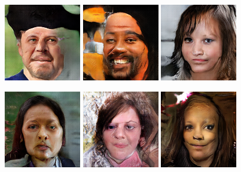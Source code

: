 \begin{figure}[!h]
    \centerline{
        \includegraphics[scale=1]{figures/ffhq/random/ffhq128x128_image0000.png}
        \includegraphics[scale=1]{figures/ffhq/random/ffhq128x128_image0001.png}
        \includegraphics[scale=1]{figures/ffhq/random/ffhq128x128_image0002.png}
    }
    \vspace{0.1cm}
    \centerline{
        \includegraphics[scale=0.485]{figures/ffhq/random/ffhq128x128_image0003.png}
        \includegraphics[scale=0.485]{figures/ffhq/random/ffhq128x128_image0004.png}
        \includegraphics[scale=0.485]{figures/ffhq/random/ffhq128x128_image0005.png}
}
\end{figure}
